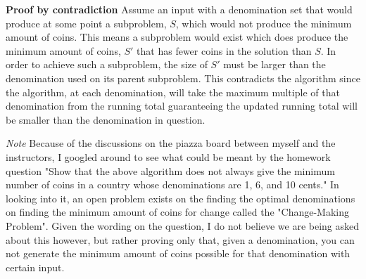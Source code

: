 \documentclass{article}
\begin{document}
\textbf{Proof by contradiction} Assume an input with a denomination set that 
would produce at some point a subproblem, $S$, which would not produce the 
minimum amount of coins. This means a subproblem would exist which does produce
the minimum amount of coins, $S'$ that has fewer coins in the solution than $S$.
In order to achieve such a subproblem, the size of $S'$ must be larger than the 
denomination used on its parent subproblem. This contradicts the algorithm since
the algorithm, at each denomination, will take the maximum multiple of that 
denomination from the running total guaranteeing the updated running total will 
be smaller than the denomination in question. 

\textit{Note} Because of the discussions on the piazza board between myself and
the instructors, I googled around to see what could be meant by the homework 
question "Show that the above algorithm does not always give the minimum number
of coins in a country whose denominations are 1, 6, and 10 cents." In looking 
into it, an open problem exists on the finding the optimal denominations on 
finding the minimum amount of coins for change called the 
"Change-Making Problem". Given the wording on the question, I do not believe we 
are being asked about this however, but rather proving only that, given a 
denomination, you can not generate the minimum amount of coins possible for that
denomination with certain input. 
\newpage

\end{document}
